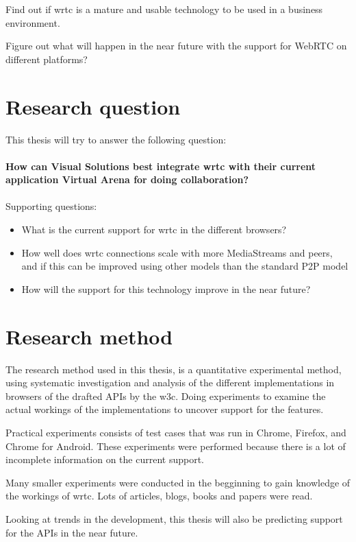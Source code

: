 Find out if \gls{wrtc} is a mature and usable technology to be used in a business environment.

Figure out what will happen in the near future with the support for WebRTC on different platforms?


\section{Research question}
This thesis will try to answer the following question:
\\
\\
\textbf{How can Visual Solutions best integrate \gls{wrtc} with their current application Virtual Arena for doing collaboration?}
\\
\\
Supporting questions:

\begin{itemize}
    \item What is the current support for \gls{wrtc} in the different browsers?
    \item How well does \gls{wrtc} connections scale with more MediaStreams and peers, and if this can be improved using other models than the standard P2P model
    \item How will the support for this technology improve in the near future?
\end{itemize}


\section{Research method}
The research method used in this thesis, is a quantitative experimental method, using systematic investigation and analysis of the different implementations in browsers of the drafted APIs by the \gls{w3c}. Doing experiments to examine the actual workings of the implementations to uncover support for the features.

Practical experiments consists of test cases that was run in Chrome, Firefox, and Chrome for Android. These experiments were performed because there is a lot of incomplete information on the current support.

Many smaller experiments were conducted in the begginning to gain knowledge of the workings of \gls{wrtc}. Lots of articles, blogs, books and papers were read.

Looking at trends in the development, this thesis will also be predicting support for the APIs in the near future. 


